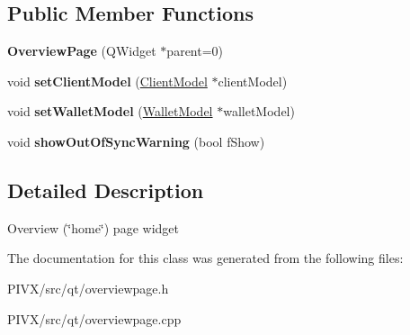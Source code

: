 \subsection*{Public Member Functions}
\begin{DoxyCompactItemize}
\item 
\mbox{\label{class_overview_page_a18c1a29cab6b745b25e701b20f234932}} 
{\bfseries Overview\+Page} (Q\+Widget $\ast$parent=0)
\item 
\mbox{\label{class_overview_page_a5d2610ab2b9c58e3b5f67c05f984e097}} 
void {\bfseries set\+Client\+Model} (\mbox{\hyperlink{class_client_model}{Client\+Model}} $\ast$client\+Model)
\item 
\mbox{\label{class_overview_page_a2ed52a3a87e9c74fee38fa873c9bc71f}} 
void {\bfseries set\+Wallet\+Model} (\mbox{\hyperlink{class_wallet_model}{Wallet\+Model}} $\ast$wallet\+Model)
\item 
\mbox{\label{class_overview_page_ac96ea713a074e706b4b6eadaadeca9d1}} 
void {\bfseries show\+Out\+Of\+Sync\+Warning} (bool f\+Show)
\end{DoxyCompactItemize}


\subsection{Detailed Description}
Overview (\char`\"{}home\char`\"{}) page widget 

The documentation for this class was generated from the following files\+:\begin{DoxyCompactItemize}
\item 
P\+I\+V\+X/src/qt/overviewpage.\+h\item 
P\+I\+V\+X/src/qt/overviewpage.\+cpp\end{DoxyCompactItemize}
